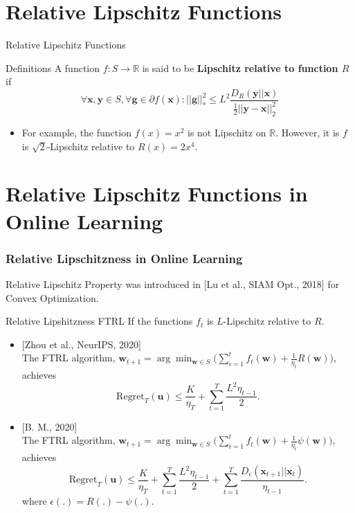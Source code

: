 \documentclass[usenames,dvipsnames, 10pt]{beamer}
\newcommand{\R}{\mathbb{R}}
\newcommand{\y}{\mathbf{y}}
\newcommand{\uu}{\mathbf{u}}
\newcommand{\w}{\mathbf{w}}
\newcommand{\x}{\mathbf{x}}
\begin{document}
\section{Relative Lipschitz Functions}
\begin{frame}{Relative Lipschitz Functions}
	\begin{exampleblock}{Definitions}
		A function $f: S \to \R$ is said to be \textbf{Lipschitz relative to  function $R$} if 
			\begin{equation*}
			\forall \x, \y \in S, \forall \mathbf{g} \in \partial f(\x):  ||\mathbf{g}||_*^2 \leq L^2 \frac{D_R(\y||\x)}{\frac{1}{2}||\y - \x||_2^2}
			\end{equation*}	
	\end{exampleblock}
	\begin{itemize}
		\item For example, the function $f(x) = x^2$ is not Lipschitz on $\mathbb{R}$. However, it is $f$ is $\sqrt{2}$-Lipschitz relative to $R(x) = 2x^4$.		
	\end{itemize}
\end{frame}


\section{Relative Lipschitz Functions in Online Learning}
\begin{frame}
	\frametitle{Relative Lipschitzness in Online Learning}
		Relative Lipschitz Property was introduced in {\small [Lu et al., SIAM Opt., 2018]} for Convex Optimization.
	\begin{alertblock}{Relative Lipshitzness FTRL}
		If the functions $f_t$ is $L$-Lipschitz relative to $R$. 
		\begin{itemize}
			\item  \small [Zhou et al., NeurIPS, 2020]\\ The FTRL algorithm, $\w_{t+1} = \arg\min_{\w\in S} \big(\sum_{i = 1}^{t}f_t(\w) + \frac{1}{\eta_t}R(\w)\big)$,  achieves
			\vspace{-0.2cm}
			\begin{equation*}
			\mathrm{Regret}_T(\uu) \leq \frac{K}{\eta_T} + \sum_{t = 1}^{T} \frac{L^2 \eta_{t-1}}{2}.
			\end{equation*}
			
			\item  \small [B. M., 2020]\\ The FTRL algorithm, $\w_{t+1} = \arg\min_{\w\in S} \big(\sum_{i = 1}^{t}f_t(\w) + \frac{1}{\eta_t}\psi(\w)\big)$, achieves
			\vspace{-0.2cm}
			\begin{equation*}
			\mathrm{Regret}_T(\uu) \leq \frac{K}{\eta_T} + \sum_{t = 1}^{T} \frac{L^2 \eta_{t-1}}{2} + \sum_{t = 1}^{T} \frac{D_\epsilon(\x_{t+1}||\x_t)}{\eta_{t-1}}.
			\end{equation*}
			where $\epsilon(.) = R(.) - \psi(.)$.
		\end{itemize}
	\end{alertblock}
\end{frame}
\end{document}
